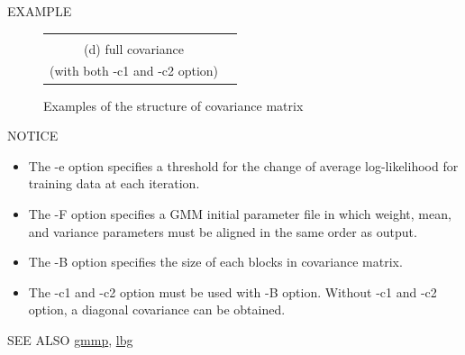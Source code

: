 \begin{qsection}{EXAMPLE}
\begin{figure}[h]
\begin{center}
\begin{tabular}{cc}
\begin{minipage}[b]{0.45\hsize}
\begin{center}
     \\ (d) full covariance \\(with both -c1 and -c2 option)
    \end{center}
   \end{minipage}
  \end{tabular}
 \end{center}
 \caption{Examples of the structure of covariance matrix}
 \label{fig:gmm_c1}
 \end{figure}
\end{qsection}

\newpage

\begin{qsection}{NOTICE}
\begin{itemize}
\item The -e option specifies a threshold for the change of average
 log-likelihood for training data at each iteration.
\item The -F option specifies a GMM initial parameter file in which
weight, mean, and variance parameters must be aligned in the same
order as output.
\item The -B option specifies the size of each blocks in covariance matrix.
\item The -c1 and -c2 option must be used with -B option. Without -c1 and
-c2 option, a diagonal covariance can be obtained.
\end{itemize}
\end{qsection}

\begin{qsection}{SEE ALSO}
\hyperlink{gmmp}{gmmp},
\hyperlink{lbg}{lbg}
\end{qsection}
